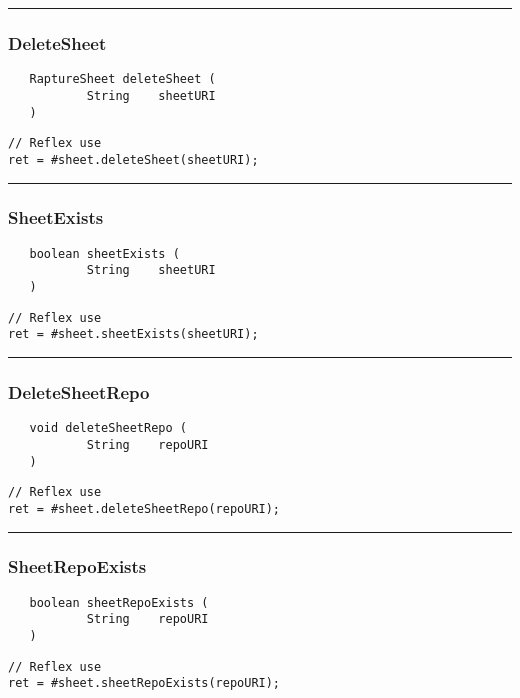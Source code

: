 \rule{15cm}{2pt}
\subsubsection{DeleteSheet}
\label{Api:DeleteSheet}
\begin{verbatim}
   RaptureSheet deleteSheet (
           String    sheetURI
   )
\end{verbatim}
\begin{lstlisting}[language=reflex]
// Reflex use
ret = #sheet.deleteSheet(sheetURI);
\end{lstlisting}



\rule{15cm}{2pt}
\subsubsection{SheetExists}
\label{Api:SheetExists}
\begin{verbatim}
   boolean sheetExists (
           String    sheetURI
   )
\end{verbatim}
\begin{lstlisting}[language=reflex]
// Reflex use
ret = #sheet.sheetExists(sheetURI);
\end{lstlisting}



\rule{15cm}{2pt}
\subsubsection{DeleteSheetRepo}
\label{Api:DeleteSheetRepo}
\begin{verbatim}
   void deleteSheetRepo (
           String    repoURI
   )
\end{verbatim}
\begin{lstlisting}[language=reflex]
// Reflex use
ret = #sheet.deleteSheetRepo(repoURI);
\end{lstlisting}



\rule{15cm}{2pt}
\subsubsection{SheetRepoExists}
\label{Api:SheetRepoExists}
\begin{verbatim}
   boolean sheetRepoExists (
           String    repoURI
   )
\end{verbatim}
\begin{lstlisting}[language=reflex]
// Reflex use
ret = #sheet.sheetRepoExists(repoURI);
\end{lstlisting}



